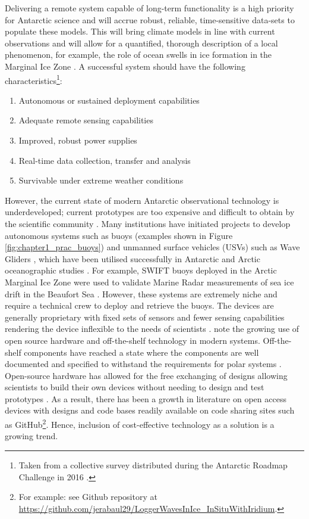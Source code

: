 Delivering a remote system capable of long-term functionality is a high priority for Antarctic science \cite{kennicutt2016delivering} and will accrue robust, reliable, time-sensitive data-sets to populate these models. This will bring climate models in line with current observations and will allow for a quantified, thorough description of a local phenomenon, for example, the role of ocean swells in ice formation in the Marginal Ice Zone \cite{doble2013wave,doble2017robust}. A successful system should have the following characteristics\footnote{Taken from a collective survey distributed during the Antarctic Roadmap Challenge in 2016 \cite{kennicutt2016delivering}.}: 
\begin{enumerate}

    \item Autonomous or sustained deployment capabilities
    \item Adequate remote sensing capabilities
    \item Improved, robust power supplies
    \item Real-time data collection, transfer and analysis
    \item Survivable under extreme weather conditions
\end{enumerate}

However, the current state of  modern Antarctic observational technology is underdeveloped; current prototypes are too expensive and difficult to obtain by the scientific community \cite{kennicutt2016delivering}. Many institutions have initiated projects to develop autonomous systems such as buoys (examples shown in Figure \ref{fig:chapter1_prac_buoys}) and unmanned surface vehicles (USVs) such as Wave Gliders \cite{liquidrobot2016wave}, which  have been utilised successfully in Antarctic and Arctic oceanographic studies \cite{swart2020submesoscale}. For example, SWIFT buoys deployed in the Arctic Marginal Ice Zone were used to validate Marine Radar measurements of sea ice drift in the Beaufort Sea \cite{lund2018Arctic}. However, these systems are extremely niche and require a technical crew to deploy and retrieve the buoys. The devices are generally proprietary with fixed sets of sensors and fewer sensing capabilities rendering the device inflexible to the needs of scientists \cite{rabault2017measurements}. \textcite{rabault2019open} note the growing use of open source hardware and off-the-shelf technology in modern systems. Off-the-shelf  components have reached a state where the components are well documented and specified to withstand the requirements for polar systems \cite{rabault2019open}. Open-source hardware has allowed for the free exchanging of designs allowing scientists to build their own devices without needing to design and test prototypes \cite{rabault2019open}. As a result, there has been a growth in literature on open access devices with designs and code bases readily available on code sharing sites such as GitHub\footnote{For example: see \textcite{rabault2019open} Github repository at \url{https://github.com/jerabaul29/LoggerWavesInIce_InSituWithIridium}.}. Hence, inclusion of cost-effective technology as a solution is a growing trend. \par 

